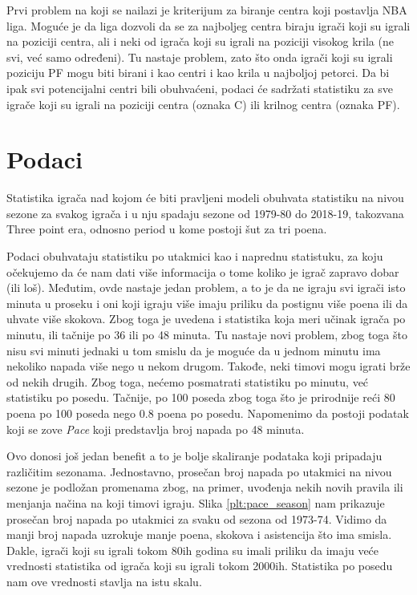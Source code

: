 \documentclass[a4paper]{article}
\begin{document}
Prvi problem na koji se nailazi je kriterijum za biranje centra koji postavlja
NBA liga. Moguće je da liga dozvoli da se za najboljeg centra biraju igrači koji
su igrali na poziciji centra, ali i neki od igrača koji su igrali na poziciji visokog krila (ne svi, već samo određeni). Tu nastaje problem, zato što onda igrači koji su igrali poziciju PF mogu biti birani i kao centri i kao krila u najboljoj petorci. Da bi ipak svi potencijalni centri bili obuhvaćeni, podaci će sadržati statistiku za sve igrače koji su igrali na poziciji centra (oznaka C) ili krilnog centra (oznaka PF).

\section{Podaci}
\label{sec:podaci}

Statistika igrača nad kojom će biti pravljeni modeli obuhvata statistiku na nivou sezone za svakog igrača i u nju spadaju sezone od 1979-80 do 2018-19, takozvana Three point era, odnosno period u kome postoji šut za tri poena.

Podaci obuhvataju statistiku po utakmici kao i naprednu statistuku, za koju
očekujemo da će nam dati više informacija o tome koliko je igrač zapravo dobar (ili loš). Međutim, ovde nastaje jedan problem, a to je da ne igraju svi igrači isto minuta u proseku i oni koji igraju više imaju priliku da postignu više poena ili da uhvate više skokova. Zbog toga je uvedena i statistika koja meri učinak igrača po minutu, ili tačnije po 36 ili po 48 minuta. Tu nastaje novi problem, zbog toga što nisu svi minuti jednaki u tom smislu da je moguće da u jednom minutu ima nekoliko napada više nego u nekom drugom. Takođe, neki timovi mogu igrati brže od nekih drugih. Zbog toga, nećemo posmatrati statistiku po minutu, već statistiku po posedu. Tačnije, po 100 poseda zbog toga što je prirodnije reći 80 poena po 100 poseda nego 0.8 poena po posedu. Napomenimo da postoji podatak koji se zove \textit{Pace} koji predstavlja broj napada po 48 minuta.

Ovo donosi još jedan benefit a to je bolje skaliranje podataka koji pripadaju različitim sezonama. Jednostavno, prosečan broj napada po utakmici na nivou sezone je podložan promenama zbog, na primer, uvođenja nekih novih pravila ili menjanja načina na koji timovi igraju. Slika \ref{plt:pace_season} nam prikazuje prosečan broj napada po utakmici za svaku od sezona od 1973-74. Vidimo da manji broj napada uzrokuje manje poena, skokova i asistencija što ima smisla. Dakle, igrači koji su igrali tokom 80ih godina su imali priliku da imaju veće vrednosti statistika od igrača koji su igrali tokom 2000ih. Statistika po posedu nam ove vrednosti stavlja na istu skalu.
\end{document}
